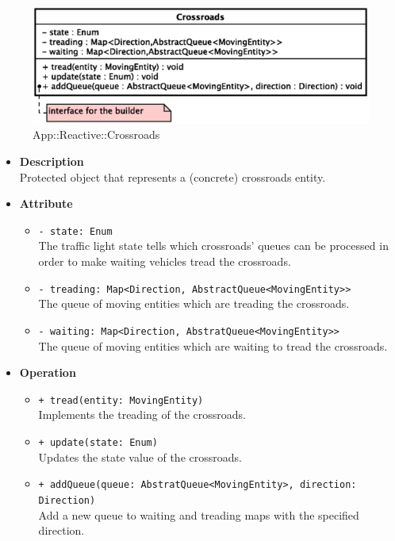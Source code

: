 \begin{figure}[h]
\centering
\includegraphics[scale=0.6,keepaspectratio]{images/solution/crossroads.eps}
\caption{App::Reactive::Crossroads}
\label{fig:sd-app-crossroads}
\end{figure}
\FloatBarrier
\begin{itemize}
  \item \textbf{Description} \\
    Protected object that represents a (concrete) crossroads entity.
  \item \textbf{Attribute}
  \begin{itemize}
    \item \texttt{- state: Enum} \\
The traffic light state tells which crossroads' queues can be processed in
order to make waiting vehicles tread the crossroads.
    \item \texttt{- treading: Map<Direction, AbstractQueue<MovingEntity>>} \\
The queue of moving entities which are treading the crossroads.
    \item \texttt{- waiting: Map<Direction, AbstratQueue<MovingEntity>>} \\
The queue of moving entities which are waiting to tread the crossroads. 
  \end{itemize}
  \item \textbf{Operation}
  \begin{itemize} 
    \item \texttt{+ tread(entity: MovingEntity)} \\
Implements the treading of the crossroads.
    \item \texttt{+ update(state: Enum)} \\
Updates the state value of the crossroads.
    \item \texttt{+ addQueue(queue: AbstratQueue<MovingEntity>, direction: 
Direction)} \\
Add a new queue to waiting and treading maps with the specified direction.
  \end{itemize}
\end{itemize}
